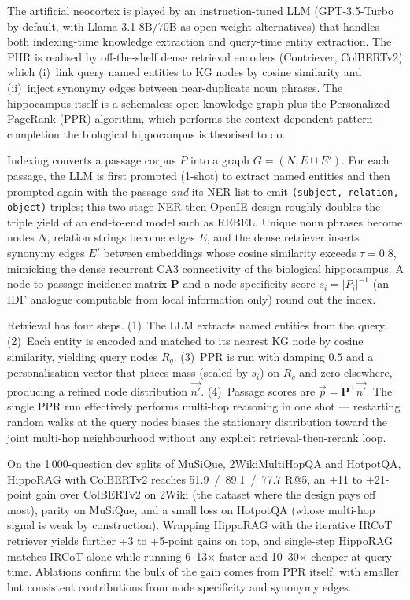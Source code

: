 \documentclass{article}
\begin{document}
The artificial neocortex is played by an instruction-tuned LLM (GPT-3.5-Turbo by default, with Llama-3.1-8B/70B as open-weight alternatives) that handles both indexing-time knowledge extraction and query-time entity extraction. The PHR is realised by off-the-shelf dense retrieval encoders (Contriever, ColBERTv2) which (i)~link query named entities to KG nodes by cosine similarity and (ii)~inject synonymy edges between near-duplicate noun phrases. The hippocampus itself is a schemaless open knowledge graph plus the Personalized PageRank (PPR) algorithm, which performs the context-dependent pattern completion the biological hippocampus is theorised to do.

Indexing converts a passage corpus $P$ into a graph $G = (N, E \cup E')$. For each passage, the LLM is first prompted (1-shot) to extract named entities and then prompted again with the passage \emph{and} its NER list to emit \texttt{(subject, relation, object)} triples; this two-stage NER-then-OpenIE design roughly doubles the triple yield of an end-to-end model such as REBEL. Unique noun phrases become nodes $N$, relation strings become edges $E$, and the dense retriever inserts synonymy edges $E'$ between embeddings whose cosine similarity exceeds $\tau = 0.8$, mimicking the dense recurrent CA3 connectivity of the biological hippocampus. A node-to-passage incidence matrix $\mathbf{P}$ and a node-specificity score $s_i = |P_i|^{-1}$ (an IDF analogue computable from local information only) round out the index.

Retrieval has four steps. (1)~The LLM extracts named entities from the query. (2)~Each entity is encoded and matched to its nearest KG node by cosine similarity, yielding query nodes $R_q$. (3)~PPR is run with damping $0.5$ and a personalisation vector that places mass (scaled by $s_i$) on $R_q$ and zero elsewhere, producing a refined node distribution $\vec{n'}$. (4)~Passage scores are $\vec{p} = \mathbf{P}^\top \vec{n'}$. The single PPR run effectively performs multi-hop reasoning in one shot --- restarting random walks at the query nodes biases the stationary distribution toward the joint multi-hop neighbourhood without any explicit retrieval-then-rerank loop.

On the 1\,000-question dev splits of MuSiQue, 2WikiMultiHopQA and HotpotQA, HippoRAG with ColBERTv2 reaches 51.9~/~89.1~/~77.7 R@5, an +11 to +21-point gain over ColBERTv2 on 2Wiki (the dataset where the design pays off most), parity on MuSiQue, and a small loss on HotpotQA (whose multi-hop signal is weak by construction). Wrapping HippoRAG with the iterative IRCoT retriever yields further +3 to +5-point gains on top, and single-step HippoRAG matches IRCoT alone while running 6--13$\times$ faster and 10--30$\times$ cheaper at query time. Ablations confirm the bulk of the gain comes from PPR itself, with smaller but consistent contributions from node specificity and synonymy edges.
\end{document}
